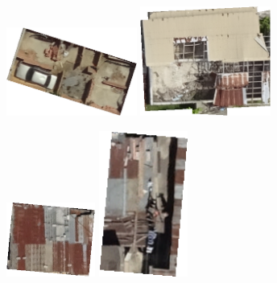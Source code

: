 \documentclass[11pt]{article}
\begin{document}
\begin{figure}
\begin{subfigure}[c]{0.32\textwidth}
		\end{subfigure}
		\begin{subfigure}[c]{0.32\textwidth}
			\includegraphics[width=0.47\textwidth]{figures/mat_examples/inc1.png}		
			\includegraphics[width=0.47\textwidth]{figures/mat_examples/inc2.png}
		\end{subfigure}
		\begin{subfigure}[c]{0.32\textwidth}
			\includegraphics[width=0.32\textwidth]{figures/mat_examples/irr1.png}		
			\includegraphics[width=0.32\textwidth]{figures/mat_examples/irr2.png}

\end{subfigure}
\end{figure}
\end{document}
